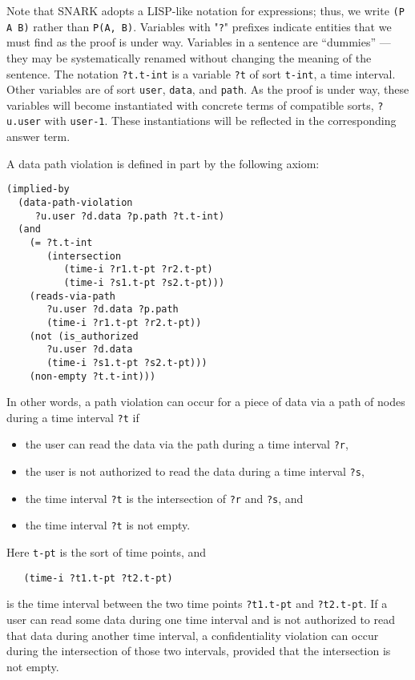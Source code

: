 Note that SNARK adopts a LISP-like notation for expressions; thus, we write \verb'(P A B)' rather than \verb'P(A, B)'. 
Variables with "\verb'?'" prefixes indicate entities that we must find as the proof is under way.
Variables in a sentence are ``dummies'' \---- they may be systematically renamed without changing the meaning of the sentence. 
The notation \verb'?t.t-int' is a variable \verb'?t' of sort \verb't-int', \ie a time interval. 
Other variables are of sort \verb'user', \verb'data', and \verb'path'.
As the proof is under way, these variables will become instantiated with concrete terms of compatible sorts, \eg \verb'?u.user' with \verb'user-1'. 
These instantiations will be reflected in the corresponding answer term.

A data path violation is defined in part by the following axiom:   
\begin{verbatim}                                             
(implied-by
  (data-path-violation 
     ?u.user ?d.data ?p.path ?t.t-int)
  (and
    (= ?t.t-int
       (intersection
    	  (time-i ?r1.t-pt ?r2.t-pt)
    	  (time-i ?s1.t-pt ?s2.t-pt)))
    (reads-via-path
       ?u.user ?d.data ?p.path 
       (time-i ?r1.t-pt ?r2.t-pt))
    (not (is_authorized
       ?u.user ?d.data
       (time-i ?s1.t-pt ?s2.t-pt)))
    (non-empty ?t.t-int)))
\end{verbatim}

In other words, a path violation can occur for a piece of data via a path of nodes during a time interval \verb'?t' if
\begin{itemize}
\item the user can read the data via the path during a time interval \verb'?r',
\item the user is not authorized to read the data during a time interval \verb'?s',
\item the time interval \verb'?t' is the intersection of \verb'?r' and \verb'?s', and
\item the time interval \verb'?t' is not empty.
\end{itemize}

Here  \verb't-pt' is the sort of time points, and  
\begin{verbatim}
   (time-i ?t1.t-pt ?t2.t-pt)
\end{verbatim} 
is the time interval between the two time points \verb'?t1.t-pt' and \verb'?t2.t-pt'. If a user can read some data during one time interval and is not authorized to read that data during another time interval, a confidentiality violation can occur during the intersection of those two intervals, provided that the intersection is not empty.


